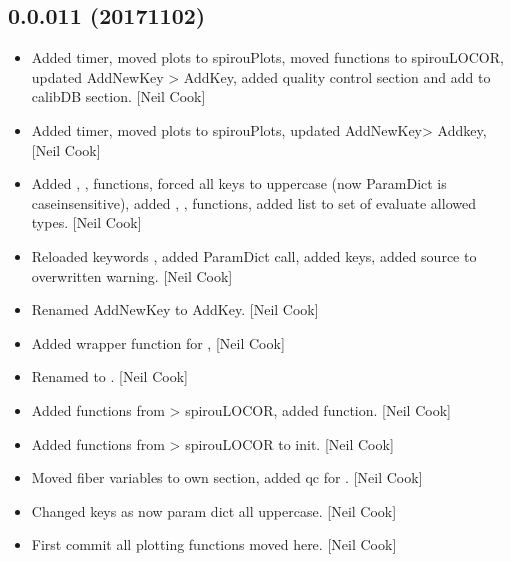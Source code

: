 \documentclass[a4paper,10pt,english]{report}
\begin{document}
\subsection{0.0.011 (2017\sphinxhyphen{}11\sphinxhyphen{}02)}
\label{\detokenize{misc/changelog:id559}}\begin{itemize}
\item {} 
Added timer, moved plots to spirouPlots, moved functions to
spirouLOCOR, updated AddNewKey \textendash{}\textgreater{} AddKey, added quality control
section and add to calibDB section. {[}Neil Cook{]}

\item {} 
Added timer, moved plots to spirouPlots, updated AddNewKey\textendash{}\textgreater{} Addkey,
{[}Neil Cook{]}

\item {} 
Added , ,  functions, forced all keys
to uppercase (now ParamDict is case\sphinxhyphen{}insensitive), added ,
,  functions, added list to set
of evaluate allowed types. {[}Neil Cook{]}

\item {} 
Reloaded keywords , added ParamDict call, added  keys,
added source to overwritten warning. {[}Neil Cook{]}

\item {} 
Renamed AddNewKey to AddKey. {[}Neil Cook{]}

\item {} 
Added wrapper function for  , {[}Neil Cook{]}

\item {} 
Renamed  to
. {[}Neil Cook{]}

\item {} 
Added functions from  \textendash{}\textgreater{} spirouLOCOR, added
 function. {[}Neil Cook{]}

\item {} 
Added functions from  \textendash{}\textgreater{} spirouLOCOR to init. {[}Neil Cook{]}

\item {} 
Moved fiber variables to own section, added qc for . {[}Neil
Cook{]}

\item {} 
Changed keys as now param dict all uppercase. {[}Neil Cook{]}

\item {} 
First commit \sphinxhyphen{} all plotting functions moved here. {[}Neil Cook{]}

\end{itemize}
\end{document}
